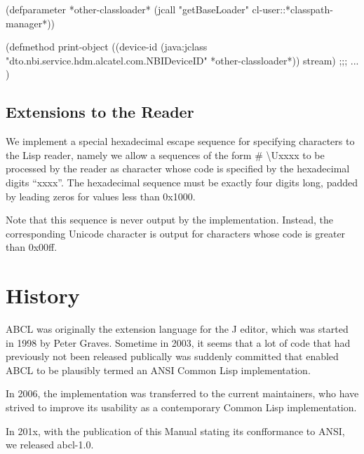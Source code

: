 \documentclass[10pt]{book}
\begin{document}
\begin{listing-lisp}

(defparameter *other-classloader*
  (jcall "getBaseLoader" cl-user::*classpath-manager*))
  
(defmethod print-object ((device-id (java:jclass "dto.nbi.service.hdm.alcatel.com.NBIDeviceID" *other-classloader*))
                         stream)
  ;;; ...
)
\end{listing-lisp}

\section{Extensions to the Reader}

We implement a special hexadecimal escape sequence for specifying
characters to the Lisp reader, namely we allow a sequences of the form
\# \textbackslash Uxxxx to be processed by the reader as character whose code is
specified by the hexadecimal digits ``xxxx''.  The hexadecimal sequence
must be exactly four digits long, padded by leading zeros for values
less than 0x1000.

Note that this sequence is never output by the implementation.  Instead,
the corresponding Unicode character is output for characters whose
code is greater than 0x00ff.

\chapter{History}

ABCL was originally the extension language for the J editor, which was
started in 1998 by Peter Graves.  Sometime in 2003, it seems that a
lot of code that had previously not been released publically was
suddenly committed that enabled ABCL to be plausibly termed an ANSI
Common Lisp implementation.  

In 2006, the implementation was transferred to the current
maintainers, who have strived to improve its usability as a
contemporary Common Lisp implementation.

In 201x, with the publication of this Manual stating its confformance
to ANSI, we released abcl-1.0.
\end{document}

